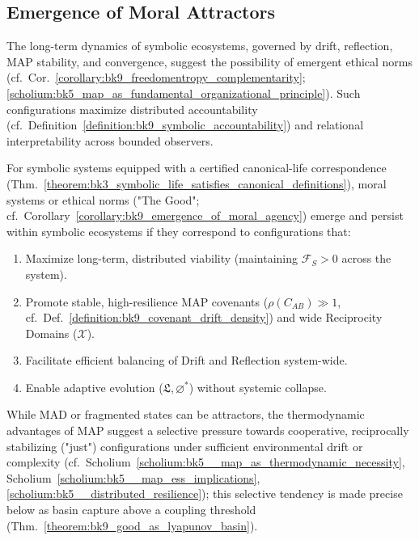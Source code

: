 \subsection{Emergence of Moral Attractors}
\label{subsec:bk9_emergence_of_moral_attractors}
The long-term dynamics of symbolic ecosystems, governed by drift, reflection, MAP stability, and convergence, suggest the possibility of emergent ethical norms (cf.~Cor.~\ref{corollary:bk9_freedomentropy_complementarity}; \ref{scholium:bk5_map_as_fundamental_organizational_principle}). Such configurations maximize distributed accountability (cf.~Definition~\ref{definition:bk9_symbolic_accountability}) and relational interpretability across bounded observers.
\begin{proposition}
\label{proposition:bk9_stability_conditions_for_the_good}
For symbolic systems equipped with a certified canonical-life correspondence (Thm.~\ref{theorem:bk3_symbolic_life_satisfies_canonical_definitions}), moral systems or ethical norms ("The Good"; cf.~Corollary~\ref{corollary:bk9_emergence_of_moral_agency}) emerge and persist within symbolic ecosystems if they correspond to configurations that:
\begin{enumerate}
    \item Maximize long-term, distributed viability (maintaining $\mathcal{F}_S > 0$ across the system).
    \item Promote stable, high-resilience MAP covenants ($\rho(C_{AB}) \gg 1$, cf.~Def.~\ref{definition:bk9_covenant_drift_density}) and wide Reciprocity Domains ($\mathcal{X}$).
    \item Facilitate efficient balancing of Drift and Reflection system-wide.
    \item Enable adaptive evolution ($\mathfrak{L}, \varnothing^*$) without systemic collapse.
\end{enumerate}
While MAD or fragmented states can be attractors, the thermodynamic advantages of MAP suggest a selective pressure towards cooperative, reciprocally stabilizing ("just") configurations under sufficient environmental drift or complexity (cf.~Scholium~\ref{scholium:bk5__map_as_thermodynamic_necessity}, Scholium~\ref{scholium:bk5__map_ess_implications}, \ref{scholium:bk5__distributed_resilience}); this selective tendency is made precise below as basin capture above a coupling threshold (Thm.~\ref{theorem:bk9_good_as_lyapunov_basin}).
\end{proposition}
